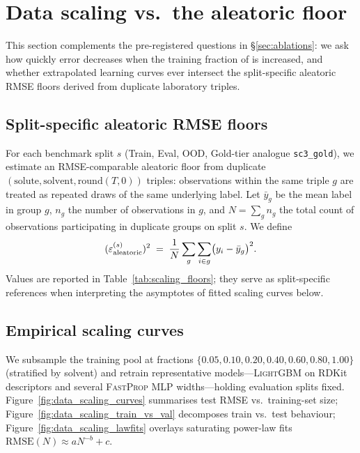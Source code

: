 \section{Data scaling vs.\ the aleatoric floor}
\label{sec:data_scaling}

This section complements the pre-registered questions in §\ref{sec:ablations}: we ask how quickly error decreases when the training fraction of \scthree{} is increased, and whether extrapolated learning curves ever intersect the split-specific aleatoric RMSE floors derived from duplicate laboratory triples.

\subsection{Split-specific aleatoric RMSE floors}
\label{sec:scaling_floors_sub}

For each benchmark split $s$ (Train, Eval, OOD, Gold-tier analogue \texttt{sc3\_gold}), we estimate an RMSE-comparable aleatoric floor from duplicate $(\text{solute},\text{solvent},\mathrm{round}(T,0))$ triples: observations within the same triple $g$ are treated as repeated draws of the same underlying label.
Let $\bar{y}_g$ be the mean label in group $g$, $n_g$ the number of observations in $g$, and $N=\sum_g n_g$ the total count of observations participating in duplicate groups on split $s$.
We define
\begin{equation}
  (\varepsilon_{\text{aleatoric}}^{(s)})^2 \;=\; \frac{1}{N}\sum_{g}\sum_{i\in g}\bigl(y_i-\bar{y}_g\bigr)^2 .
  \label{eq:eps_split}
\end{equation}
Values are reported in Table~\ref{tab:scaling_floors}; they serve as split-specific references when interpreting the asymptotes of fitted scaling curves below.

\subsection{Empirical scaling curves}
\label{sec:scaling_curves_sub}

We subsample the training pool at fractions $\{0.05,0.10,0.20,0.40,0.60,0.80,1.00\}$ (stratified by solvent) and retrain representative models---\textsc{LightGBM} on RDKit descriptors and several \textsc{FastProp} MLP widths---holding evaluation splits fixed.
Figure~\ref{fig:data_scaling_curves} summarises test RMSE vs.\ training-set size; Figure~\ref{fig:data_scaling_train_vs_val} decomposes train vs.\ test behaviour; Figure~\ref{fig:data_scaling_lawfits} overlays saturating power-law fits $\mathrm{RMSE}(N)\approx a N^{-b}+c$.

